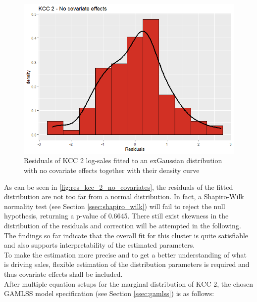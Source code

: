 \begin{figure}[H]
\centering
  \includegraphics[width=0.45\linewidth]{figures/res_kcc_2_no_covariates.png}
  \caption{Residuals of KCC 2 log-sales fitted to an exGaussian distribution with no covariate effects together with their density curve}
  \label{fig:res_kcc_2_no_covariates}
\end{figure}

As can be seen in \autoref{fig:res_kcc_2_no_covariates}, the residuals of the fitted distribution are not too far from a normal distribution. 
In fact, a Shapiro-Wilk normality test (see Section \ref{ssec:shapiro_wilk}) will fail to reject the null hypothesis, returning a p-value of 0.6645.
There still exist skewness in the distribution of the residuals and correction will be attempted in the following. \\

The findings so far indicate that the overall fit for this cluster is quite satisfiable and also supports interpretability of the estimated parameters. \\
To make the estimation more precise and to get a better understanding of what is driving sales, flexible estimation of the distribution parameters is required and thus covariate effects shall be included. \\

After multiple equation setups for the marginal distribution of \ac{KCC} 2, the chosen \ac{GAMLSS} model specification (see Section \ref{ssec:gamlss}) is as follows:

